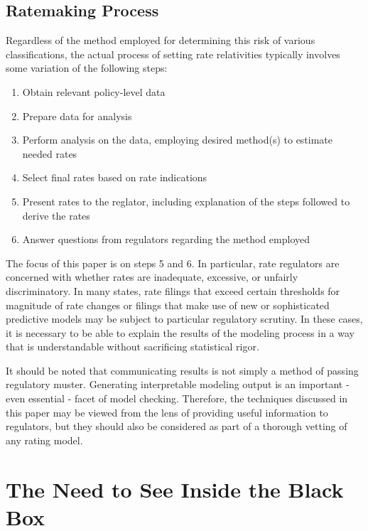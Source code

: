\documentclass[preprint, 3p, twocolumn, letterpaper, 10pt]{elsarticle} %
\providecommand{\tightlist}{%
  \setlength{\itemsep}{0pt}\setlength{\parskip}{0pt}}
\begin{document}
\hypertarget{ratemaking-process}{%
\subsection{Ratemaking Process}\label{ratemaking-process}}

Regardless of the method employed for determining this risk of various
classifications, the actual process of setting rate relativities typically
involves some variation of the following steps:

\begin{enumerate}
\def\labelenumi{\arabic{enumi}.}
\tightlist
\item
  Obtain relevant policy-level data
\item
  Prepare data for analysis
\item
  Perform analysis on the data, employing desired method(s) to estimate
  needed rates
\item
  Select final rates based on rate indications
\item
  Present rates to the reglator, including explanation of the steps followed to
  derive the rates
\item
  Answer questions from regulators regarding the method employed
\end{enumerate}

The focus of this paper is on steps 5 and 6. In particular, rate regulators are
concerned with whether rates are inadequate, excessive, or unfairly
discriminatory. In many states, rate filings that exceed certain thresholds for
magnitude of rate changes or filings that make use of new or sophisticated
predictive models may be subject to particular regulatory scrutiny. In these cases,
it is necessary to be able to explain the results of the modeling process in a
way that is understandable without sacrificing statistical rigor.

It should be noted that communicating results is not simply a method of passing
regulatory muster. Generating interpretable modeling output is an important -
even essential - facet of model checking. Therefore, the techniques discussed
in this paper may be viewed from the lens of providing useful information to
regulators, but they should also be considered as part of a thorough vetting of
any rating model.

\hypertarget{need}{%
\section{The Need to See Inside the Black Box}\label{need}}
\end{document}
